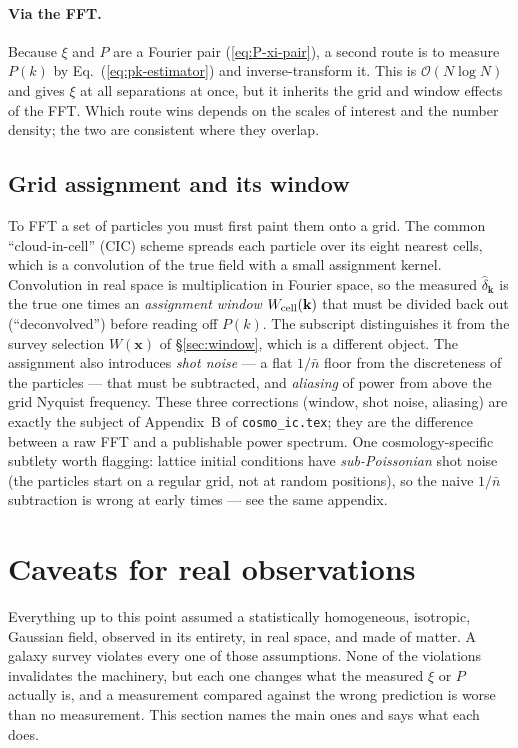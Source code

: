 \documentclass[12pt]{article}
\newcommand{\bk}{\mathbf{k}}
\newcommand{\bx}{\mathbf{x}}
\newcommand{\code}[1]{\texttt{#1}}
\begin{document}
\paragraph{Via the FFT.}  Because $\xi$ and $P$ are a Fourier pair
(\ref{eq:P-xi-pair}), a second route is to measure $P(k)$ by
Eq.~(\ref{eq:pk-estimator}) and inverse-transform it.  This is $\mathcal
O(N\log N)$ and gives $\xi$ at all separations at once, but it inherits
the grid and window effects of the FFT.  Which route wins depends on the
scales of interest and the number density; the two are consistent where
they overlap.

\subsection{Grid assignment and its window}
\label{sec:cic}

To FFT a set of particles you must first paint them onto a grid.  The
common ``cloud-in-cell'' (CIC) scheme spreads each particle over its
eight nearest cells, which is a convolution of the true field with a
small assignment kernel.  Convolution in real space is multiplication in
Fourier space, so the measured $\hat\delta_\bk$ is the true one times an
\emph{assignment window} $W_{\rm cell}(\bk)$ that must be divided back
out (``deconvolved'') before reading off $P(k)$.  The subscript
distinguishes it from the survey selection $W(\bx)$ of
\S\ref{sec:window}, which is a different object.  The assignment also
introduces \emph{shot noise} --- a flat $1/\bar n$ floor from the
discreteness of the particles --- that must be subtracted, and
\emph{aliasing} of power from above the grid Nyquist frequency.  These
three corrections (window, shot noise, aliasing) are exactly the subject
of Appendix~B of \code{cosmo\_ic.tex}; they are the difference between a
raw FFT and a publishable power spectrum.  One cosmology-specific subtlety
worth flagging: lattice initial conditions have \emph{sub-Poissonian}
shot noise (the particles start on a regular grid, not at random
positions), so the naive $1/\bar n$ subtraction is wrong at early times
--- see the same appendix.

\section{Caveats for real observations}
\label{sec:observational}

Everything up to this point assumed a statistically homogeneous,
isotropic, Gaussian field, observed in its entirety, in real space, and
made of matter.  A galaxy survey violates every one of those assumptions.
None of the violations invalidates the machinery, but each one changes
what the measured $\xi$ or $P$ actually is, and a measurement compared
against the wrong prediction is worse than no measurement.  This section
names the main ones and says what each does.
\end{document}
